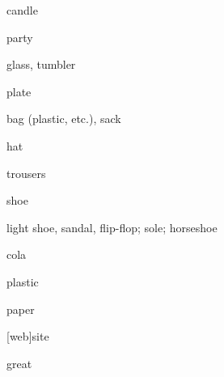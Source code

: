 \begin{flashcard}{\LARGE candle}
\LARGE {}
\end{flashcard}
\begin{flashcard}{\LARGE party}
\LARGE {}
\end{flashcard}
\begin{flashcard}{\LARGE glass, tumbler}
\LARGE {}
\end{flashcard}
\begin{flashcard}{\LARGE plate}
\LARGE {}
\end{flashcard}
\begin{flashcard}{\LARGE bag (plastic, etc.), sack}
\LARGE {}
\end{flashcard}
\begin{flashcard}{\LARGE hat}
\LARGE {}
\end{flashcard}
\begin{flashcard}{\LARGE trousers}
\LARGE {}
\end{flashcard}
\begin{flashcard}{\LARGE shoe}
\LARGE {}
\end{flashcard}
\begin{flashcard}{\LARGE light shoe, sandal, flip-flop; sole; horseshoe}
\LARGE {}
\end{flashcard}
\begin{flashcard}{\LARGE cola}
\LARGE {}
\end{flashcard}
\begin{flashcard}{\LARGE plastic}
\LARGE {}
\end{flashcard}
\begin{flashcard}{\LARGE paper}
\LARGE {}
\end{flashcard}
\begin{flashcard}{\LARGE {[}web{]}site}
\LARGE {}
\end{flashcard}
\begin{flashcard}{\LARGE great}
\LARGE {}
\end{flashcard}
